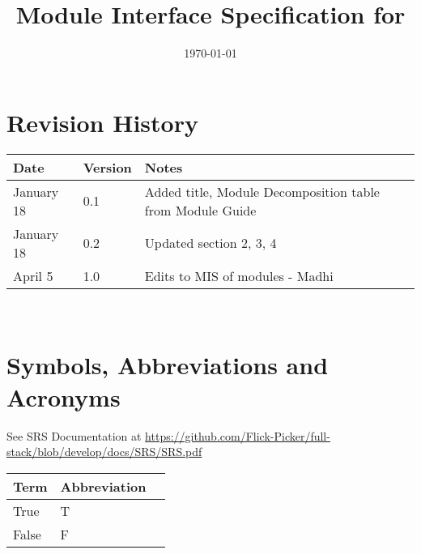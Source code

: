 \documentclass[12pt, titlepage]{article}
\begin{document}
\title{Module Interface Specification for \progname{}}

\author{\authname}

\date{\today}

\maketitle


\section{Revision History}

\begin{tabularx}{\textwidth}{p{3cm}p{2cm}X}
\toprule {\bf Date} & {\bf Version} & {\bf Notes}\\
\midrule
January 18 & 0.1 & Added title, Module Decomposition table from Module Guide\\
January 18 & 0.2 & Updated section 2, 3, 4\\
April 5 & 1.0 &  Edits to MIS of modules - Madhi \\
\bottomrule
\end{tabularx}

~\newpage

\section{Symbols, Abbreviations and Acronyms}

See SRS Documentation at \url{https://github.com/Flick-Picker/full-stack/blob/develop/docs/SRS/SRS.pdf}

\begin{center}
	\renewcommand{\arraystretch}{1.2}
	\noindent 
	\begin{tabular}{l l p{7.5cm}} 
		\toprule 
		\textbf{Term} & \textbf{Abbreviation}\\ 
		\midrule
		True & T\\
		False & F\\
		\bottomrule
	\end{tabular}
\end{center}





\newpage

\tableofcontents

\newpage

\end{document}
